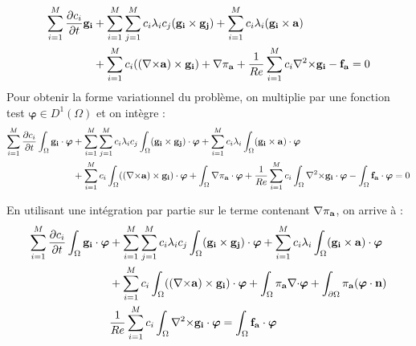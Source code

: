 \begin{align*}
\sum_{i=1}^M\frac{\partial c_i}{\partial t}\mathbf{g_i} &+ \sum_{i=1}^M\sum_{j=1}^Mc_i\lambda_ic_j(\mathbf{g_i}\times \mathbf{g_j}) + \sum_{i=1}^Mc_i\lambda_i(\mathbf{g_i}\times \mathbf{a})\\
& +  \sum_{i=1}^Mc_i(({\nabla\times}\mathbf{a})\times \mathbf{g_i}) + {\nabla} \pi_{\mathbf{a}} +\frac{1}{Re}\sum_{i=1}^Mc_i{\nabla^2\times}\mathbf{g_i} - \mathbf{f_a} = 0\\
\end{align*}
Pour obtenir la forme variationnel du problème, on multiplie par une fonction test $\bm{\varphi}\in D^1(\Omega)$ et on intègre :
\begin{align*}
\sum_{i=1}^M\frac{\partial c_i}{\partial t}\int_\Omega\mathbf{g_i}\cdot\bm{\varphi} &+ \sum_{i=1}^M\sum_{j=1}^Mc_i\lambda_ic_j\int_\Omega(\mathbf{g_i}\times \mathbf{g_j})\cdot\bm{\varphi} + \sum_{i=1}^Mc_i\lambda_i\int_\Omega(\mathbf{g_i}\times \mathbf{a})\cdot\bm{\varphi}\\
& +  \sum_{i=1}^Mc_i\int_\Omega(({\nabla\times}\mathbf{a})\times \mathbf{g_i})\cdot\bm{\varphi} + \int_\Omega{\nabla} \pi_{\mathbf{a}}\cdot\bm{\varphi} +\frac{1}{Re}\sum_{i=1}^Mc_i\int_\Omega{\nabla^2\times}\mathbf{g_i}\cdot\bm{\varphi} - \int_\Omega\mathbf{f_a}\cdot\bm{\varphi} = 0\\
\end{align*}

En utilisant une intégration par partie sur le terme contenant ${\nabla}\pi_{\mathbf{a}}$, on arrive à :
\begin{align*}
\sum_{i=1}^M\frac{\partial c_i}{\partial t}\int_\Omega\mathbf{g_i}\cdot\bm{\varphi} &+ \sum_{i=1}^M\sum_{j=1}^Mc_i\lambda_ic_j\int_\Omega(\mathbf{g_i}\times \mathbf{g_j})\cdot\bm{\varphi} + \sum_{i=1}^Mc_i\lambda_i\int_\Omega(\mathbf{g_i}\times \mathbf{a})\cdot\bm{\varphi}\\
& +  \sum_{i=1}^Mc_i\int_\Omega(({\nabla\times}\mathbf{a})\times \mathbf{g_i})\cdot\bm{\varphi} + \int_\Omega\pi_{\mathbf{a}}{\nabla\cdot}\bm{\varphi} + \int_{\partial\Omega}\pi_{\mathbf{a}}(\bm{\varphi}\cdot\mathbf{n})\\
& \frac{1}{Re}\sum_{i=1}^Mc_i\int_\Omega{\nabla^2\times}\mathbf{g_i}\cdot\bm{\varphi} = \int_\Omega\mathbf{f_a}\cdot\bm{\varphi}\\
\end{align*}

